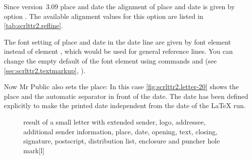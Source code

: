 Since version~3.09 place and date the
alignment of place and date is given by option . The available
alignment values for this option are listed in \autoref{tab:scrlttr2.refline}.

%
The font setting of place and date in the
date line are given by font
element
instead of element , which would be used for general
reference lines. You can change the empty default of the font element using
commands  and  (see
\autoref{sec:scrlttr2.textmarkup},
).%
%

\begin{Example}
  Now Mr Public also sets the place:%
  In this case \autoref{fig:scrlttr2.letter-20} shows the place and the
  automatic separator in front of the date. The date has been defined
  explicitly to make the printed date independent from the date of the
  \LaTeX{} run.
  \begin{figure}
    \setcapindent{0pt}%
    \begin{captionbeside}
      {result of a small letter with extended sender, logo, addressee,
        additional sender information, place, date, opening, text, closing,
        signature, postscript, distribution list, enclosure and puncher hole
        mark}[l]
    \end{captionbeside}
    \label{fig:scrlttr2.letter-20}
  \end{figure}
\end{Example}
%
\EndIndexGroup
%
\EndIndexGroup


